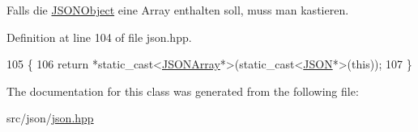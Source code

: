 Falls die \mbox{\hyperlink{class_j_s_o_n_object}{J\+S\+O\+N\+Object}} eine Array enthalten soll, muss man kastieren. 

Definition at line 104 of file json.\+hpp.


\begin{DoxyCode}
105 \{
106     \textcolor{keywordflow}{return} *\textcolor{keyword}{static\_cast<}\mbox{\hyperlink{class_j_s_o_n_array}{JSONArray}}*\textcolor{keyword}{>}(\textcolor{keyword}{static\_cast<}\mbox{\hyperlink{class_j_s_o_n}{JSON}}*\textcolor{keyword}{>}(\textcolor{keyword}{this}));
107 \}
\end{DoxyCode}


The documentation for this class was generated from the following file\+:\begin{DoxyCompactItemize}
\item 
src/json/\mbox{\hyperlink{src_2json_2json_8hpp}{json.\+hpp}}\end{DoxyCompactItemize}
